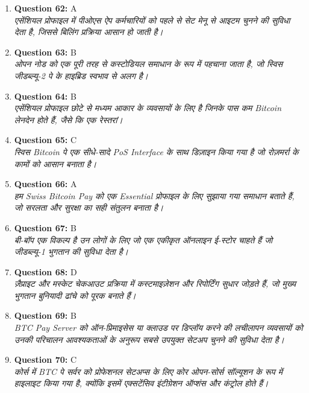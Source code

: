 \documentclass[12pt,a4paper]{article}
\begin{document}
\begin{enumerate}
\item \textbf{Question 62:} A
\\ \textit{एसेंशियल प्रोफाइल में पीओएस ऐप कर्मचारियों को पहले से सेट मेनू से आइटम चुनने की सुविधा देता है, जिससे बिलिंग प्रक्रिया आसान हो जाती है।}

\item \textbf{Question 63:} B
\\ \textit{ओपन नोड को एक पूरी तरह से कस्टोडियल समाधान के रूप में पहचाना जाता है, जो स्विस जीडब्ल्यू-2 पे के हाइब्रिड स्वभाव से अलग है।}

\item \textbf{Question 64:} B
\\ \textit{एसेंशियल प्रोफाइल छोटे से मध्यम आकार के व्यवसायों के लिए है जिनके पास कम Bitcoin लेनदेन होते हैं, जैसे कि एक रेस्तरां।}

\item \textbf{Question 65:} C
\\ \textit{स्विस Bitcoin पे एक सीधे-सादे PoS Interface के साथ डिज़ाइन किया गया है जो रोज़मर्रा के कामों को आसान बनाता है।}

\item \textbf{Question 66:} A
\\ \textit{हम Swiss Bitcoin Pay को एक Essential प्रोफाइल के लिए सुझाया गया समाधान बताते हैं, जो सरलता और सुरक्षा का सही संतुलन बनाता है।}

\item \textbf{Question 67:} B
\\ \textit{बी-बॉप एक विकल्प है उन लोगों के लिए जो एक एकीकृत ऑनलाइन ई-स्टोर चाहते हैं जो जीडब्ल्यू-1 भुगतान की सुविधा देता है।}

\item \textbf{Question 68:} D
\\ \textit{ज़ैप्राइट और मस्केट चेकआउट प्रक्रिया में कस्टमाइज़ेशन और रिपोर्टिंग सुधार जोड़ते हैं, जो मुख्य भुगतान बुनियादी ढांचे को पूरक बनाते हैं।}

\item \textbf{Question 69:} B
\\ \textit{BTC Pay Server को ऑन-प्रिमाइसेस या क्लाउड पर डिप्लॉय करने की लचीलापन व्यवसायों को उनकी परिचालन आवश्यकताओं के अनुरूप सबसे उपयुक्त सेटअप चुनने की सुविधा देता है।}

\item \textbf{Question 70:} C
\\ \textit{कोर्स में BTC पे सर्वर को प्रोफेशनल सेटअप्स के लिए कोर ओपन-सोर्स सॉल्यूशन के रूप में हाइलाइट किया गया है, क्योंकि इसमें एक्सटेंसिव इंटीग्रेशन ऑप्शंस और कंट्रोल होते हैं।}


\end{enumerate}
\end{document}
